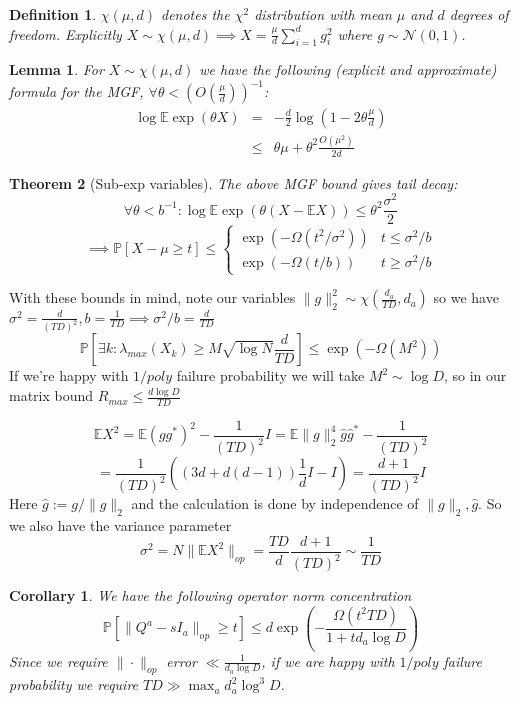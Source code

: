\documentclass{article}
\newtheorem{theorem}{Theorem}
\newtheorem{corollary}{Corollary}
\newtheorem{lemma}[theorem]{Lemma}
\newtheorem{definition}{Definition}
\newcommand{\E}{\mathbb{E}}
\renewcommand{\Pr}{\mathbb{P}}
\begin{document}
\begin{definition}
$\chi(\mu,d)$ denotes the $\chi^{2}$ distribution with mean $\mu$ and $d$ degrees of freedom. Explicitly $X \sim \chi(\mu,d) \implies X = \frac{\mu}{d} \sum_{i=1}^{d} g_{i}^{2}$
where $g \sim \mathcal{N}(0,1)$.
\end{definition}

\begin{lemma}
For $X \sim \chi(\mu,d)$ we have the following (explicit and approximate) formula for the MGF, $\forall \theta < \left(O(\frac{\mu}{d}) \right)^{-1}$:
\begin{eqnarray*} \log \E \exp(\theta X) & = & - \frac{d}{2} \log \left(1 - 2 \theta \frac{\mu}{d} \right)
\\ & \leq & \theta \mu + \theta^{2} \frac{O(\mu^{2})}{2 d}
\end{eqnarray*}
\end{lemma}

\begin{theorem} [Sub-exp variables]
The above MGF bound gives tail decay:
\[ \forall \theta < b^{-1}: \log \E \exp(\theta (X - \E X)) \leq \theta^{2} \frac{\sigma^{2}}{2} \]
\[ \implies  \Pr[X - \mu \geq t] \leq \begin{cases}
\exp( - \Omega(t^{2}/\sigma^{2}) ) & t \leq \sigma^{2}/b
\\ \exp( - \Omega(t/b) ) & t \geq \sigma^{2}/b
\end{cases}   \]
\end{theorem}

With these bounds in mind, note our variables $\|g\|_{2}^{2} \sim \chi(\frac{d_{a}}{TD},d_{a})$ so we have $\sigma^{2} = \frac{d}{(TD)^{2}}, b = \frac{1}{TD} \implies \sigma^{2}/b = \frac{d}{TD}$
\[ \Pr[ \exists k: \lambda_{max}(X_{k}) \geq M \sqrt{\log N}\frac{d}{TD} ] \leq \exp( - \Omega(M^{2}) )  \]
If we're happy with $1/poly$ failure probability we will take $M^{2} \sim \log D$, so in our matrix bound $R_{max} \leq \frac{d \log D}{TD}$

\[ \E X^{2} = \E (g g^{*})^{2} - \frac{1}{(TD)^{2}} I = \E \|g\|_{2}^{4} \hat{g} \hat{g}^{*} - \frac{1}{(TD)^{2}} \]
\[ = \frac{1}{(TD)^{2}} ( (3d + d(d-1)) \frac{1}{d} I - I ) = \frac{d+1}{(TD)^{2}} I   \]
Here $\hat{g} := g / \|g\|_{2}$ and the calculation is done by independence of $\|g\|_{2}, \hat{g}$. So we also have the variance parameter
\[ \sigma^{2} = N \|\E X^{2}\|_{op} = \frac{TD}{d} \frac{d+1}{(TD)^{2}} \sim \frac{1}{TD}  \]

\begin{corollary}
We have the following operator norm concentration
\[ \Pr[ \|Q^{a} - sI_{a}\|_{op} \geq t ] \leq d \exp \left( - \frac{\Omega(t^{2} TD)}{1 + t d_{a} \log D }  \right)  \]
Since we require $\|\cdot\|_{op}$ error $\ll \frac{1}{d_{a} \log D}$, if we are happy with $1/poly$ failure probability we require $TD \gg \max_{a} d_{a}^{2} \log^{3} D$.
\end{corollary}
\end{document}
